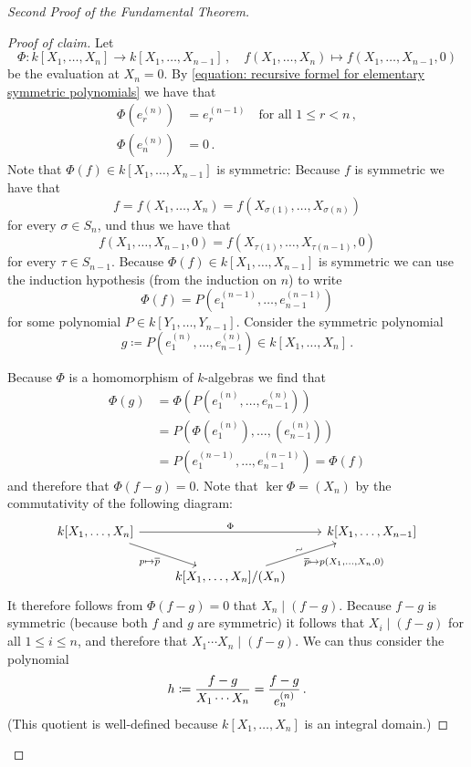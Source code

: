 \begin{proof}[Second Proof of the Fundamental Theorem]
\begin{proof}[Proof of claim]
    Let
    \[
              \Phi
      \colon  k[X_1, \dotsc, X_n]
      \to     k[X_1, \dotsc, X_{n-1}] \,,
      \quad   f(X_1, \dotsc, X_n)
      \mapsto f(X_1, \dotsc, X_{n-1}, 0)
    \]
    be the evaluation at $X_n = 0$.
    By \eqref{equation: recursive formel for elementary symmetric polynomials} we have that
    \begin{align*}
          \Phi\left( e^{(n)}_r \right)
      &=  e^{(n-1)}_r
      \quad \text{for all $1 \leq r < n$} \,,
      \\
          \Phi\left( e^{(n)}_n \right)
      &=  0 \,.
    \end{align*}
    Note that $\Phi(f) \in k[X_1, \dotsc, X_{n-1}]$ is symmetric:
    Because $f$ is symmetric we have that
    \[
        f
      = f(X_1, \dotsc, X_n)
      = f(X_{\sigma(1)}, \dotsc, X_{\sigma(n)})
    \]
    for every $\sigma \in S_n$, und thus we have that
    \[
        f(X_1, \dotsc, X_{n-1}, 0)
      = f(X_{\tau(1)}, \dotsc, X_{\tau(n-1)}, 0)
    \]
    for every $\tau \in S_{n-1}$.
    Because $\Phi(f) \in k[X_1, \dotsc, X_{n-1}]$ is symmetric we can use the induction hypothesis (from the induction on $n$) to write
    \[
        \Phi(f)
      = P\left( e^{(n-1)}_1, \dotsc, e^{(n-1)}_{n-1} \right)
    \]
    for some polynomial $P \in k[Y_1, \dotsc, Y_{n-1}]$.
    Consider the symmetric polynomial
    \[
                g
      \coloneqq P\left( e^{(n)}_1, \dotsc, e^{(n)}_{n-1} \right)
      \in       k[X_1, \dotsc, X_n] \,.
    \]
    
    Because $\Phi$ is a homomorphism of $k$-algebras we find that
    \begin{align*}
         \Phi(g)
      &= \Phi\left( P\left(e^{(n)}_1, \dotsc, e^{(n)}_{n-1}\right) \right) \\
      &= P\left( \Phi\left(e^{(n)}_1\right), \dotsc, \left(e^{(n)}_{n-1}\right) \right) \\
      &= P\left( e^{(n-1)}_1, \dotsc, e^{(n-1)}_{n-1} \right)
       = \Phi(f)
    \end{align*}
    and therefore that $\Phi(f - g) = 0$.
    Note that $\ker \Phi = (X_n)$ by the commutativity of the following diagram:
    \[
      \begin{tikzcd}
          k[X_1, \dotsc, X_n]
          \arrow{rr}[above]{\Phi}
          \arrow{rd}[below left]{p \mapsto \class{p}}
        & {}
        & k[X_1, \dotsc, X_{n-1}]
        \\
          {}
        & k[X_1, \dotsc, X_n]/(X_n)
          \arrow{ru}[above,rotate=20]{\sim}[below right]{\class{p} \mapsto p(X_1, \dotsc, X_n, 0)}
        & {}
      \end{tikzcd}
    \]
    It therefore follows from $\Phi(f - g) = 0$ that $X_n \mid (f-g)$.
    Because $f-g$ is symmetric (because both $f$ and $g$ are symmetric) it follows that $X_i \mid (f-g)$ for all $1 \leq i \leq n$, and therefore that $X_1 \dotsm X_n \mid (f-g)$.
    We can thus consider the polynomial
    \[
                h
      \coloneqq  \frac{f-g}{X_1 \dotsm X_n}
      =         \frac{f-g}{e^{(n)}_n} \,.
    \]
    (This quotient is well-defined because $k[X_1, \dotsc, X_n]$ is an integral domain.)
    

\end{proof}
\end{proof}
